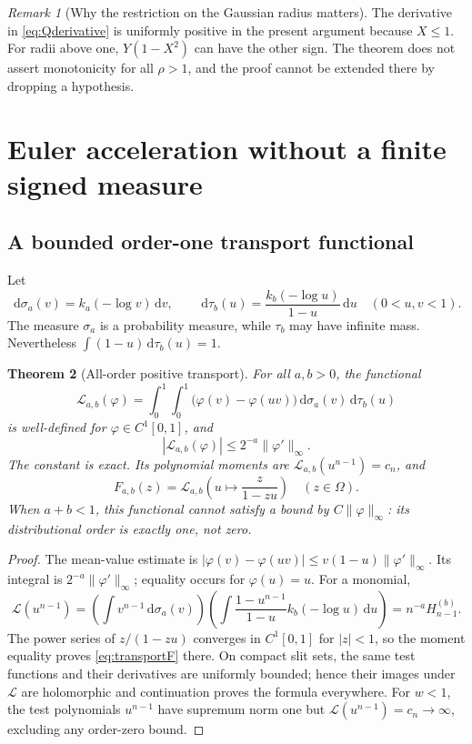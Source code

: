 \documentclass[11pt]{article}
\numberwithin{equation}{section}
\newtheorem{theorem}{Theorem}[section]
\theoremstyle{definition}
\theoremstyle{remark}
\newtheorem{remark}[theorem]{Remark}
\newcommand{\dd}{\,\mathrm d}
\newcommand{\cut}{\Omega}
\begin{document}
\begin{remark}[Why the restriction on the Gaussian radius matters]
The derivative in \eqref{eq:Qderivative} is uniformly positive in the
present argument because $X\le1$. For radii above one, $Y(1-X^2)$ can
have the other sign. The theorem does not assert monotonicity for all
$\rho>1$, and the proof cannot be extended there by dropping a hypothesis.
\end{remark}

\section{Euler acceleration without a finite signed measure}
\label{sec:euler}
\subsection{A bounded order-one transport functional}
Let
\begin{equation}\label{eq:transportmeasures}
 \dd\sigma_a(v)=k_a(-\log v)\dd v,\qquad
 \dd\tau_b(u)=\frac{k_b(-\log u)}{1-u}\dd u\quad(0<u,v<1).
\end{equation}
The measure $\sigma_a$ is a probability measure, while $\tau_b$ may
have infinite mass. Nevertheless
$\int(1-u)\dd\tau_b(u)=1$.

\begin{theorem}[All-order positive transport]\label{thm:transport}
For all $a,b>0$, the functional
\begin{equation}\label{eq:L}
 \mathcal L_{a,b}(\varphi)
 =\int_0^1\int_0^1\bigl(\varphi(v)-\varphi(uv)\bigr)
                \dd\sigma_a(v)\dd\tau_b(u)
\end{equation}
is well-defined for $\varphi\in C^1[0,1]$, and
\begin{equation}\label{eq:Lnorm}
 |\mathcal L_{a,b}(\varphi)|\le2^{-a}\|\varphi'\|_\infty.
\end{equation}
The constant is exact. Its polynomial moments are
$\mathcal L_{a,b}(u^{n-1})=c_n$, and
\begin{equation}\label{eq:transportF}
 F_{a,b}(z)=\mathcal L_{a,b}\left(u\longmapsto\frac z{1-zu}\right)
 \quad(z\in\cut).
\end{equation}
When $a+b<1$, this functional cannot satisfy a bound by
$C\|\varphi\|_\infty$: its distributional order is exactly one, not zero.
\end{theorem}
\begin{proof}
The mean-value estimate is
$|\varphi(v)-\varphi(uv)|\le v(1-u)\|\varphi'\|_\infty$.
Its integral is $2^{-a}\|\varphi'\|_\infty$; equality occurs for
$\varphi(u)=u$. For a monomial,
\[
 \mathcal L(u^{n-1})
 =\left(\int v^{n-1}\dd\sigma_a(v)\right)
   \left(\int\frac{1-u^{n-1}}{1-u}k_b(-\log u)\dd u\right)
 =n^{-a}H_{n-1}^{(b)}.
\]
The power series of $z/(1-zu)$ converges in $C^1[0,1]$ for $|z|<1$,
so the moment equality proves \eqref{eq:transportF} there.
On compact slit sets, the same test functions and their derivatives
are uniformly bounded; hence their images under $\mathcal L$ are
holomorphic and continuation proves the formula everywhere.
For $w<1$, the test polynomials $u^{n-1}$ have supremum norm one but
$\mathcal L(u^{n-1})=c_n\to\infty$, excluding any order-zero bound.
\end{proof}
\end{document}
